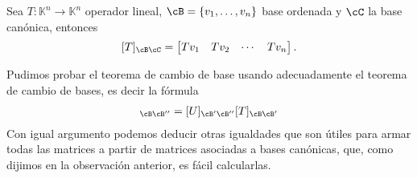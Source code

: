 \documentclass[handout]{beamer} %
\newcommand{\Id}{\operatorname{Id}}
\newcommand{\R}{\mathbb R}
\newcommand{\K}{\mathbb K}
\begin{document}
\begin{frame}

\begin{observacion} Sea $T: \K^n \to \K^n$ operador lineal, $\cB = \{v_1,\ldots,v_n\}$ base ordenada y $\cC$ la base canónica,  entonces 
$$
[T]_{\cB\cC} = \begin{bmatrix}
    Tv_1 & Tv_2 & \cdots &Tv_n
\end{bmatrix}.
$$
\end{observacion}\pause
    

\begin{observacion}
Pudimos probar el teorema de cambio de base usando adecuadamente el teorema de cambio de bases, es decir la fórmula
\begin{align*}
    [UT]_{\cB\cB''}=[U]_{\cB'\cB''}[T]_{\cB\cB'}
\end{align*}\pause
Con igual argumento podemos deducir otras igualdades que son útiles para armar todas las matrices a partir de matrices asociadas a bases canónicas, que, como  dijimos en la observación anterior, es fácil calcularlas. 
\end{observacion}
\end{frame}


\begin{frame}

\end{frame}
\end{document}
